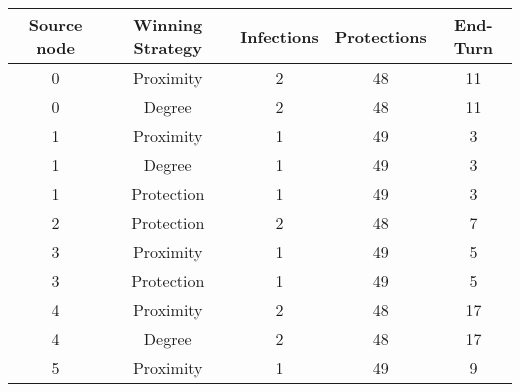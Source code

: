 \documentclass[results.tex]{subfiles}
\begin{document}
    \begin{center}
        \begin{tabular}{| c || c | c | c | c |}
            \hline
            {\bfseries Source node} & {\bfseries Winning Strategy} & {\bfseries Infections} & {\bfseries Protections}
            & {\bfseries End-Turn}
            \\  %
            \hline\hline
            0                       & Proximity                    & 2                      & 48                      & 11                   \\
            \hline
            0                       & Degree                       & 2                      & 48                      & 11                   \\
            \hline
            1                       & Proximity                    & 1                      & 49                      & 3                    \\
            \hline
            1                       & Degree                       & 1                      & 49                      & 3                    \\
            \hline
            1                       & Protection                   & 1                      & 49                      & 3                    \\
            \hline
            2                       & Protection                   & 2                      & 48                      & 7                    \\
            \hline
            3                       & Proximity                    & 1                      & 49                      & 5                    \\
            \hline
            3                       & Protection                   & 1                      & 49                      & 5                    \\
            \hline
            4                       & Proximity                    & 2                      & 48                      & 17                   \\
            \hline
            4                       & Degree                       & 2                      & 48                      & 17                   \\
            \hline
            5                       & Proximity                    & 1                      & 49                      & 9                    \\

\end{tabular}
\end{center}
\end{document}
